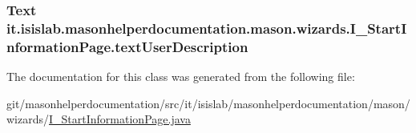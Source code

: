 \hypertarget{classit_1_1isislab_1_1masonhelperdocumentation_1_1mason_1_1wizards_1_1_i___start_information_page_a5b9b23fd18d352b235614b6bdfd23477}{
\subsubsection[{text\-User\-Description}]{\setlength{\rightskip}{0pt plus 5cm}Text it.\-isislab.\-masonhelperdocumentation.\-mason.\-wizards.\-I\-\_\-\-Start\-Information\-Page.\-text\-User\-Description\hspace{0.3cm}{\ttfamily [private]}}}\label{classit_1_1isislab_1_1masonhelperdocumentation_1_1mason_1_1wizards_1_1_i___start_information_page_a5b9b23fd18d352b235614b6bdfd23477}


The documentation for this class was generated from the following file\-:\begin{DoxyCompactItemize}
\item 
git/masonhelperdocumentation/src/it/isislab/masonhelperdocumentation/mason/wizards/\hyperlink{_i___start_information_page_8java}{I\-\_\-\-Start\-Information\-Page.\-java}\end{DoxyCompactItemize}

